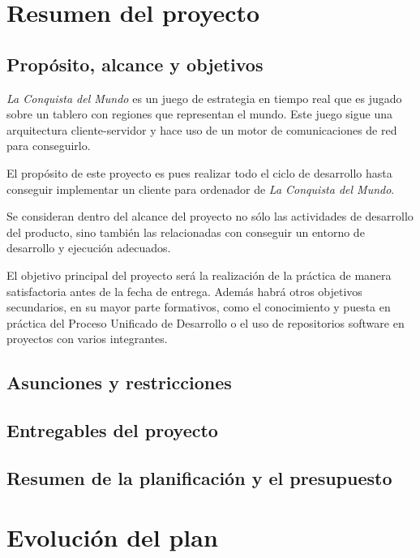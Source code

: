 \section{Resumen del proyecto}

\subsection{Propósito, alcance y objetivos}

\textit{La Conquista del Mundo} es un juego de estrategia en tiempo real que es
jugado sobre un tablero con regiones que representan el mundo. Este juego sigue
una arquitectura cliente-servidor y hace uso de un motor de comunicaciones de
red para conseguirlo.

El propósito de este proyecto es pues realizar todo el ciclo de desarrollo hasta
conseguir implementar un cliente para ordenador de \textit{La Conquista del
Mundo}.

Se consideran dentro del alcance del proyecto no sólo las actividades de
desarrollo del producto, sino también las relacionadas con conseguir un entorno
de desarrollo y ejecución adecuados.

El objetivo principal del proyecto será la realización de la práctica de manera
satisfactoria antes de la fecha de entrega. Además habrá otros objetivos
secundarios, en su mayor parte formativos, como el conocimiento y puesta en
práctica del Proceso Unificado de Desarrollo o el uso de repositorios software
en proyectos con varios integrantes.

\subsection{Asunciones y restricciones}

\subsection{Entregables del proyecto}

\subsection{Resumen de la planificación y el presupuesto}

\section{Evolución del plan}
